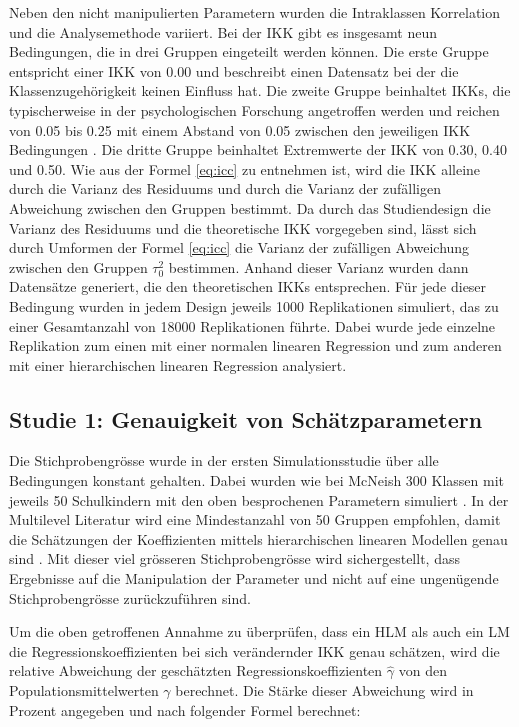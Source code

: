 \documentclass[12pt]{article}\usepackage[]{graphicx}\usepackage[]{color}
\begin{document}
Neben den nicht manipulierten Parametern wurden die Intraklassen Korrelation und die Analysemethode variiert. Bei der IKK gibt es insgesamt neun Bedingungen, die in drei Gruppen eingeteilt werden können. Die erste Gruppe entspricht einer IKK von 0.00 und beschreibt einen Datensatz bei der die Klassenzugehörigkeit keinen Einfluss hat. Die zweite Gruppe beinhaltet IKKs, die typischerweise in der psychologischen Forschung angetroffen werden und reichen von 0.05 bis 0.25 mit einem Abstand von 0.05 zwischen den jeweiligen IKK Bedingungen \citep{hedges&hedberg:2007, SnijdersTomA.B2012Ma:a}. Die dritte Gruppe beinhaltet Extremwerte der IKK von 0.30, 0.40 und 0.50. Wie aus der Formel \eqref{eq:icc} zu entnehmen ist, wird die IKK alleine durch die Varianz des Residuums und durch die Varianz der zufälligen Abweichung zwischen den Gruppen bestimmt. Da durch das Studiendesign die Varianz des Residuums und die theoretische IKK vorgegeben sind, lässt sich durch Umformen der Formel \eqref{eq:icc} die Varianz der zufälligen Abweichung zwischen den Gruppen $\tau^{2}_{0}$ bestimmen. Anhand dieser Varianz wurden dann Datensätze generiert, die den theoretischen IKKs entsprechen. Für jede dieser Bedingung wurden in jedem Design jeweils 1000 Replikationen simuliert, das zu einer Gesamtanzahl von 18000 Replikationen führte. Dabei wurde jede einzelne Replikation zum einen mit einer normalen linearen Regression und zum anderen mit einer hierarchischen linearen Regression analysiert. 

\subsection{Studie 1: Genauigkeit von Schätzparametern}
Die Stichprobengrösse wurde in der ersten Simulationsstudie über alle Bedingungen konstant gehalten. Dabei wurden wie bei McNeish 300 Klassen mit jeweils 50 Schulkindern mit den oben besprochenen Parametern simuliert \citeyearpar{mcneish2014analyzing}. In der Multilevel Literatur wird eine Mindestanzahl von 50 Gruppen empfohlen, damit die Schätzungen der Koeffizienten mittels hierarchischen linearen Modellen genau sind \citep{maashox2005samplesize}. Mit dieser viel grösseren Stichprobengrösse wird sichergestellt, dass Ergebnisse auf die Manipulation der Parameter und nicht auf eine ungenügende Stichprobengrösse zurückzuführen sind.

Um die oben getroffenen Annahme zu überprüfen, dass ein HLM als auch ein LM die Regressionskoeffizienten bei sich verändernder IKK genau schätzen, wird die relative Abweichung der geschätzten Regressionskoeffizienten $\widehat{\gamma}$ von den Populationsmittelwerten $\gamma$ berechnet. Die Stärke dieser Abweichung wird in Prozent angegeben \citep{hooglandboosma1998robustness} und nach folgender Formel berechnet: 
\end{document}
